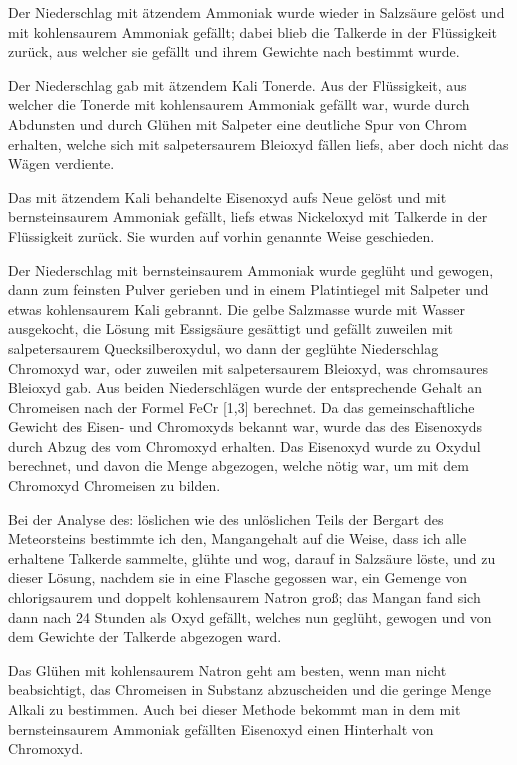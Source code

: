 \documentclass[a4paper, 11pt, oneside]{article}
\begin{document}
Der Niederschlag mit ätzendem Ammoniak wurde wieder in Salzsäure gelöst und mit kohlensaurem Ammoniak gefällt; dabei blieb die Talkerde in der Flüssigkeit zurück, aus welcher sie gefällt und ihrem Gewichte nach bestimmt wurde.

Der Niederschlag gab mit ätzendem Kali Tonerde. Aus der Flüssigkeit, aus welcher die Tonerde mit kohlensaurem Ammoniak gefällt war, wurde durch Abdunsten und durch Glühen mit Salpeter eine deutliche Spur von Chrom erhalten, welche sich mit salpetersaurem Bleioxyd fällen liefs, aber doch nicht das Wägen verdiente.

Das mit ätzendem Kali behandelte Eisenoxyd aufs Neue gelöst und mit bernsteinsaurem Ammoniak gefällt, liefs etwas Nickeloxyd mit Talkerde in der Flüssigkeit zurück. Sie wurden auf vorhin genannte Weise geschieden.

Der Niederschlag mit bernsteinsaurem Ammoniak wurde geglüht und gewogen, dann zum feinsten Pulver gerieben und in einem Platintiegel mit Salpeter und etwas kohlensaurem Kali gebrannt. Die gelbe Salzmasse wurde mit Wasser ausgekocht, die Lösung mit Essigsäure gesättigt und gefällt zuweilen mit salpetersaurem Quecksilberoxydul, wo dann der geglühte Niederschlag Chromoxyd war, oder zuweilen mit salpetersaurem Bleioxyd, was chromsaures Bleioxyd gab. Aus beiden Niederschlägen wurde der entsprechende Gehalt an Chromeisen nach der Formel FeCr [1,3] berechnet. Da das gemeinschaftliche Gewicht des Eisen- und Chromoxyds bekannt war, wurde das des Eisenoxyds durch Abzug des vom Chromoxyd erhalten. Das Eisenoxyd wurde zu Oxydul berechnet, und davon die Menge abgezogen, welche nötig war, um mit dem Chromoxyd Chromeisen zu bilden.

Bei der Analyse des: löslichen wie des unlöslichen Teils der Bergart des Meteorsteins bestimmte ich den, Mangangehalt auf die Weise, dass ich alle erhaltene Talkerde sammelte, glühte und wog, darauf in Salzsäure löste, und zu dieser Lösung, nachdem sie in eine Flasche gegossen war, ein Gemenge von chlorigsaurem und doppelt kohlensaurem Natron groß; das Mangan fand sich dann nach 24 Stunden als Oxyd gefällt, welches nun geglüht, gewogen und von dem Gewichte der Talkerde abgezogen ward.

Das Glühen mit kohlensaurem Natron geht am besten, wenn man nicht beabsichtigt, das Chromeisen in Substanz abzuscheiden und die geringe Menge Alkali zu bestimmen. Auch bei dieser Methode bekommt man in dem mit bernsteinsaurem Ammoniak gefällten Eisenoxyd einen Hinterhalt von Chromoxyd.
\end{document}
